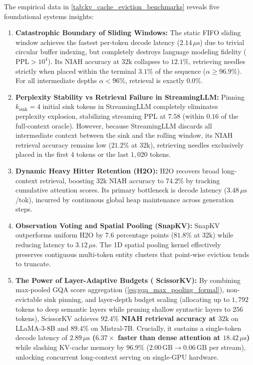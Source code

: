 The empirical data in \cref{tab:kv_cache_eviction_benchmarks} reveals five foundational systems insights:
\begin{enumerate}
    \item \textbf{Catastrophic Boundary of Sliding Windows:} The static FIFO sliding window achieves the fastest per-token decode latency ($2.14\,\mu\text{s}$) due to trivial circular buffer indexing, but completely destroys language modeling fidelity ($\text{PPL} > 10^4$). Its NIAH accuracy at $32\text{k}$ collapses to $12.1\%$, retrieving needles strictly when placed within the terminal $3.1\%$ of the sequence ($\alpha \ge 96.9\%$). For all intermediate depths $\alpha < 96\%$, retrieval is exactly $0.0\%$.
    \item \textbf{Perplexity Stability vs Retrieval Failure in StreamingLLM:} Pinning $k_{\text{sink}} = 4$ initial sink tokens in StreamingLLM completely eliminates perplexity explosion, stabilizing streaming PPL at $7.58$ (within $0.16$ of the full-context oracle). However, because StreamingLLM discards all intermediate context between the sink and the rolling window, its NIAH retrieval accuracy remains low ($21.2\%$ at $32\text{k}$), retrieving needles exclusively placed in the first $4$ tokens or the last $1{,}020$ tokens.
    \item \textbf{Dynamic Heavy Hitter Retention (\textsc{H2O}):} \textsc{H2O} recovers broad long-context retrieval, boosting 32k NIAH accuracy to $74.2\%$ by tracking cumulative attention scores. Its primary bottleneck is decode latency ($3.48\,\mu\text{s}$/tok), incurred by continuous global heap maintenance across generation steps.
    \item \textbf{Observation Voting and Spatial Pooling (SnapKV):} SnapKV outperforms uniform \textsc{H2O} by $7.6$ percentage points ($81.8\%$ at $32\text{k}$) while reducing latency to $3.12\,\mu\text{s}$. The 1D spatial pooling kernel effectively preserves contiguous multi-token entity clusters that point-wise eviction tends to truncate.
    \item \textbf{The Power of Layer-Adaptive Budgets (\neuralops{} ScissorKV):} By combining max-pooled GQA score aggregation (\cref{eq:gqa_max_pooling_formal}), non-evictable sink pinning, and layer-depth budget scaling (allocating up to $1{,}792$ tokens to deep semantic layers while pruning shallow syntactic layers to $256$ tokens), \neuralops{} ScissorKV achieves \textbf{$92.4\%$ NIAH retrieval accuracy at $32\text{k}$} on LLaMA-3-8B and \textbf{$89.4\%$} on Mistral-7B. Crucially, it sustains a single-token decode latency of \textbf{$2.89\,\mu\text{s}$ ($6.37\times$ faster than dense attention at $18.42\,\mu\text{s}$)} while slashing KV-cache memory by \textbf{$96.9\%$} ($2.00\,\text{GB} \to 0.06\,\text{GB}$ per stream), unlocking concurrent long-context serving on single-GPU hardware.
\end{enumerate}


